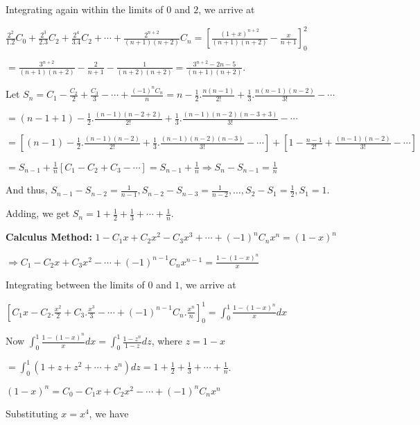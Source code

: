   Integrating again within the limits of $0$ and $2$, we arrive at

  $\frac{2^2}{1.2}C_0 + \frac{2^3}{2.3}C_2 + \frac{2^4}{3.4}C_2 + \cdots + \frac{2^{n +
      2}}{(n + 1)(n + 2)}C_n = \left[\frac{(1 + x)^{n + 2}}{(n + 1)(n + 2)} - \frac{x}{n + 1}\right]_0^2$

  $= \frac{3^{n + 2}}{(n + 1)(n + 2)} - \frac{2}{n + 1} - \frac{1}{(n + 2)(n + 2)} = \frac{3^{n + 2} - 2n
    -5}{(n + 1)(n + 2)}$.
\item Let $S_n = C_1 - \frac{C_2}{2} + \frac{C_3}{3} - \cdots + \frac{(-1)^nC_n}{n} = n -
  \frac{1}{2}.\frac{n(n - 1)}{2!} + \frac{1}{3}.\frac{n(n - 1)(n - 2)}{3!} - \cdots$

  $= (n - 1 + 1) - \frac{1}{2}.\frac{(n - 1)(n - 2 + 2)}{2!} + \frac{1}{3}.\frac{(n - 1)(n - 2)(n - 3 +
    3)}{3!} - \cdots$

  $= \left[(n - 1) - \frac{1}{2}.\frac{(n - 1)(n - 2)}{2!} + \frac{1}{3}.\frac{(n - 1)(n - 2)(n - 3)}{3!} -
    \cdots\right] + \left[1 - \frac{n - 1}{2!} + \frac{(n - 1)(n - 2)}{3!} - \cdots\right]$

  $= S_{n - 1} + \frac{1}{n}[C_1 - C_2 + C_3 - \cdots] = S_{n - 1} + \frac{1}{n}\Rightarrow S_n - S_{n - 1}
  = \frac{1}{n}$

  And thus, $S_{n - 1} - S_{n - 2} = \frac{1}{n - 1}, S_{n - 2} - S_{n - 3} = \frac{1}{n - 2}, \ldots, S_2 -
  S_1 = \frac{1}{2}, S_1 = 1$.

  Adding, we get $S_n = 1 + \frac{1}{2} + \frac{1}{3} + \cdots + \frac{1}{n}$.

  {\bf Calculus Method:} $1 - C_1x + C_2x^2 - C_3x^3 + \cdots + (-1)^nC_nx^n = (1 - x)^n$

  $\Rightarrow C_1 - C_2x + C_3x^2 - \cdots + (-1)^{n - 1}C_nx^{n - 1} = \frac{1 - (1 - x)^n}{x}$

  Integrating between the limits of $0$ and $1$, we arrive at

  $\left[C_1x - C_2.\frac{x^2}{2} + C_3.\frac{x^3}{3} - \cdots + (-1)^{n - 1}C_n.\frac{x^n}{n}\right]_0^1 =
  \displaystyle\int_0^1\frac{1 - (1 - x)^n}{x}dx$

  Now $\displaystyle\int_0^1\frac{1 - (1 - x)^n}{x}dx = \int_0^1\frac{1 - z^n}{1 - z}dz$, where $z = 1 - x$

  $= \displaystyle\int_0^1(1 + z + z^2 + \cdots + z^n)dz = 1 + \frac{1}{2} + \frac{1}{3} + \cdots +
  \frac{1}{n}$.
\item $(1 - x)^n = C_0 - C_1x + C_2x^2 - \cdots + (-1)^nC_nx^n$

  Substituting $x = x^4$, we have

